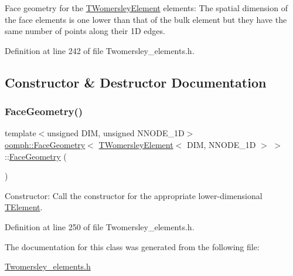 Face geometry for the \hyperlink{classoomph_1_1TWomersleyElement}{T\+Womersley\+Element} elements\+: The spatial dimension of the face elements is one lower than that of the bulk element but they have the same number of points along their 1D edges. 

Definition at line 242 of file Twomersley\+\_\+elements.\+h.



\subsection{Constructor \& Destructor Documentation}
\mbox{\label{classoomph_1_1FaceGeometry_3_01TWomersleyElement_3_01DIM_00_01NNODE__1D_01_4_01_4_ad6124924235d691ccb2db24394e9b973}} 
\subsubsection{\texorpdfstring{Face\+Geometry()}{FaceGeometry()}}
{\footnotesize\ttfamily template$<$unsigned D\+IM, unsigned N\+N\+O\+D\+E\+\_\+1D$>$ \\
\hyperlink{classoomph_1_1FaceGeometry}{oomph\+::\+Face\+Geometry}$<$ \hyperlink{classoomph_1_1TWomersleyElement}{T\+Womersley\+Element}$<$ D\+IM, N\+N\+O\+D\+E\+\_\+1D $>$ $>$\+::\hyperlink{classoomph_1_1FaceGeometry}{Face\+Geometry} (\begin{DoxyParamCaption}{ }\end{DoxyParamCaption})\hspace{0.3cm}{\ttfamily [inline]}}



Constructor\+: Call the constructor for the appropriate lower-\/dimensional \hyperlink{classoomph_1_1TElement}{T\+Element}. 



Definition at line 250 of file Twomersley\+\_\+elements.\+h.



The documentation for this class was generated from the following file\+:\begin{DoxyCompactItemize}
\item 
\hyperlink{Twomersley__elements_8h}{Twomersley\+\_\+elements.\+h}\end{DoxyCompactItemize}
